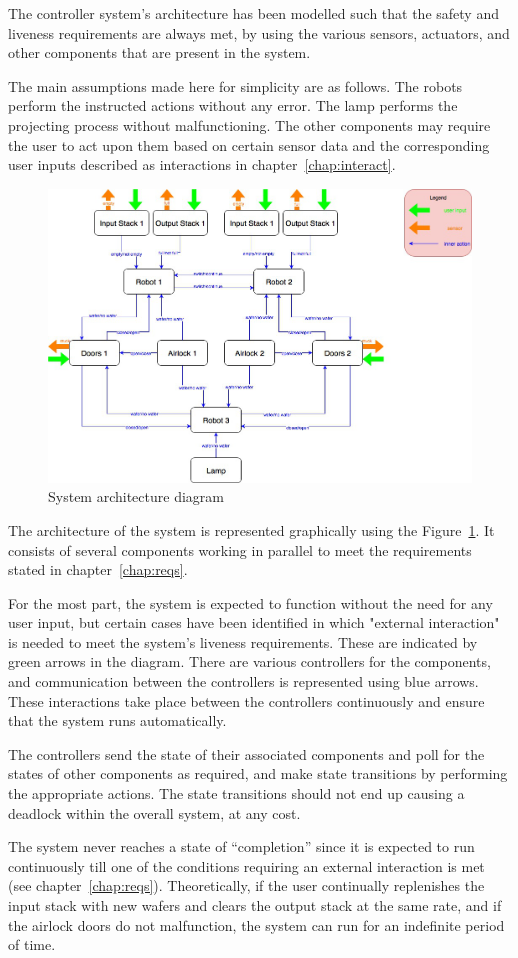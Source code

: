 
The controller system’s architecture has been modelled such that the safety and liveness requirements are always met, by using the various sensors, actuators, and other components that are present in the system.

The main assumptions made here for simplicity are as follows. The robots perform the instructed actions without any error. The lamp performs the projecting process without malfunctioning. The other components may require the user to act upon them based on certain sensor data and the corresponding user inputs described as interactions in chapter~{\ref{chap:interact}}.

\begin{figure}[h]
\centering
\includegraphics[width=150mm]{img/sv-project-arch.png}
\caption{System architecture diagram\label{fig:arch}}
\end{figure}

The architecture of the system is represented graphically using the Figure~{\ref{fig:arch}}. It consists of several components working in parallel to meet the requirements stated in chapter~{\ref{chap:reqs}}.

For the most part, the system is expected to function without the need for any user input, but certain cases have been identified in which "external interaction" is needed to meet the system’s liveness requirements. These are indicated by green arrows in the diagram. There are various controllers for the components, and communication between the controllers is represented using blue arrows. These interactions take place between the controllers continuously and ensure that the system runs automatically.

The controllers send the state of their associated components and poll for the states of other components as required, and make state transitions by performing the appropriate actions. The state transitions should not end up causing a deadlock within the overall system, at any cost. 

The system never reaches a state of “completion” since it is expected to run continuously till one of the conditions requiring an external interaction is met (see chapter~{\ref{chap:reqs}}). Theoretically, if the user continually replenishes the input stack with new wafers and clears the output stack at the same rate, and if the airlock doors do not malfunction, the system can run for an indefinite period of time.
